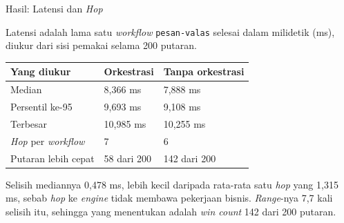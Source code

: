 \documentclass[aspectratio=169, table, 12pt]{beamer}
\begin{document}
\begin{frame}{{\Large Hasil: Latensi dan \textit{Hop}}}
  \vspace{10pt}
  \raggedright
  {\small Latensi adalah lama satu \textit{workflow} \texttt{pesan-valas}
  selesai dalam milidetik (ms), diukur dari sisi pemakai selama 200 putaran.}

  \vspace{4pt}
  \centering
  \small
  \begin{tabularx}{0.9\textwidth}{|X|l|l|}
    \hline
    \textbf{Yang diukur} & \textbf{Orkestrasi} & \textbf{Tanpa orkestrasi} \\
    \hline
    Median & 8,366 ms & 7,888 ms \\
    \hline
    Persentil ke-95 & 9,693 ms & 9,108 ms \\
    \hline
    Terbesar & 10,985 ms & 10,255 ms \\
    \hline
    \textit{Hop} per \textit{workflow} & 7 & 6 \\
    \hline
    Putaran lebih cepat & 58 dari 200 & 142 dari 200 \\
    \hline
  \end{tabularx}

  \vspace{6pt}
  \raggedright
  {\small Selisih mediannya 0,478 ms, lebih kecil daripada rata-rata satu
  \textit{hop} yang 1,315 ms, sebab \textit{hop} ke \textit{engine} tidak
  membawa pekerjaan bisnis. \textit{Range}-nya 7,7 kali selisih itu, sehingga
  yang menentukan adalah \textit{win count} 142 dari 200 putaran.}
\end{frame}
\end{document}
